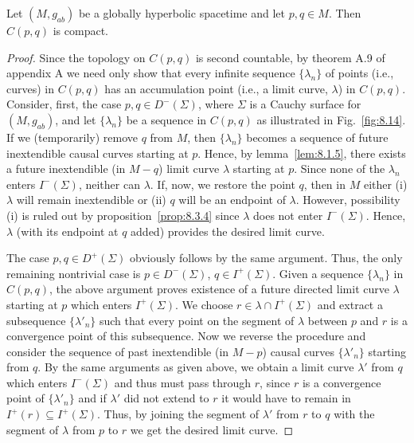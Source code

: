 \begin{theorem}\label{thm:8.3.9}
Let \((M,g_{ab})\) be a globally hyperbolic spacetime and let \(p,q\in M\). Then
\(C(p,q)\) is compact.
\end{theorem}
\begin{proof}
Since the topology on \(C(p,q)\) is second countable, by theorem A.9 of appendix A
we need only show that every infinite sequence \(\{\lambda_n\}\) of points (i.e.,
curves) in \(C(p,q)\) has an accumulation point (i.e., a limit curve, \(\lambda\)) in
\(C(p,q)\). Consider, first, the case \(p,q\in D^-(\Sigma)\), where \(\Sigma\) is a
Cauchy surface for \((M,g_{ab})\), and let \(\{\lambda_n\}\) be a sequence in
\(C(p,q)\) as illustrated in Fig.~\ref{fig:8.14}. If we (temporarily) remove \(q\)
from \(M\), then \(\{\lambda_n\}\) becomes a sequence of future inextendible causal
curves starting at \(p\). Hence, by lemma~\ref{lem:8.1.5}, there exists a future
inextendible (in \(M-q\)) limit curve \(\lambda\) starting at \(p\). Since none of the
\(\lambda_n\) enters \(I^-(\Sigma)\), neither can \(\lambda\). If, now, we restore the
point \(q\), then in \(M\) either (i) \(\lambda\) will remain inextendible or (ii)
\(q\) will be an endpoint of \(\lambda\). However, possibility (i) is ruled out by
proposition~\ref{prop:8.3.4} since \(\lambda\) does not enter \(I^-(\Sigma)\).
Hence, \(\lambda\) (with its endpoint at \(q\) added) provides the desired limit
curve.



The case \(p,q\in D^+(\Sigma)\) obviously follows by the same argument. Thus, the
only remaining nontrivial case is \(p\in D^-(\Sigma)\), \(q\in I^+(\Sigma)\). Given
a sequence \(\{\lambda_n\}\) in \(C(p,q)\), the above argument proves existence of a
future directed limit curve \(\lambda\) starting at \(p\) which enters \(I^+(\Sigma)\).
We choose \(r\in\lambda\cap I^+(\Sigma)\) and extract a subsequence
\(\{\lambda'_n\}\) such that every point on the segment of \(\lambda\) between \(p\)
and \(r\) is a convergence point of this subsequence. Now we reverse the procedure
and consider the sequence of past inextendible (in \(M-p\)) causal curves
\(\{\lambda'_n\}\) starting from \(q\). By the same arguments as given above, we
obtain a limit curve \(\lambda'\) from \(q\) which enters \(I^-(\Sigma)\) and thus
must pass through \(r\), since \(r\) is a convergence point of \(\{\lambda'_n\}\) and
if \(\lambda'\) did not extend to \(r\) it would have to remain in
\(I^+(r)\subseteq I^+(\Sigma)\). Thus, by joining the segment of \(\lambda'\) from
\(r\) to \(q\) with the segment of \(\lambda\) from \(p\) to \(r\) we get the desired
limit curve.
\end{proof}

